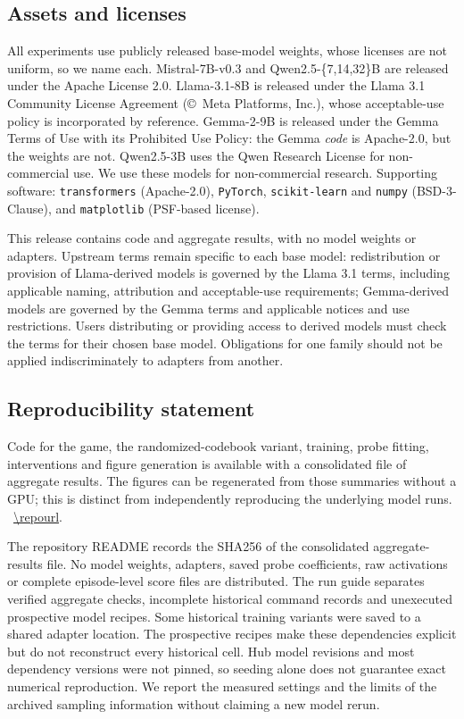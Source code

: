 \documentclass{article}
\begin{document}
\subsection{Assets and licenses}
\label{app:licenses}

All experiments use publicly released base-model weights, whose licenses are not uniform, so we
name each. Mistral-7B-v0.3 and Qwen2.5-\{7,14,32\}B are released under the
Apache License 2.0. Llama-3.1-8B is released under the Llama 3.1 Community License
Agreement (\copyright~Meta Platforms, Inc.), whose acceptable-use policy is incorporated by reference.
Gemma-2-9B is released under the Gemma Terms of Use with its Prohibited Use Policy: the Gemma \emph{code} is Apache-2.0, but the weights are not.
Qwen2.5-3B uses the Qwen Research License for non-commercial use. We use these models for non-commercial research. Supporting software: \texttt{transformers} (Apache-2.0), \texttt{PyTorch}, \texttt{scikit-learn} and \texttt{numpy} (BSD-3-Clause), and \texttt{matplotlib} (PSF-based license).

This release contains code and aggregate results, with no model weights or adapters. Upstream terms remain specific to each base model: redistribution or provision of Llama-derived models is governed by the Llama 3.1 terms, including applicable naming, attribution and acceptable-use requirements; Gemma-derived models are governed by the Gemma terms and applicable notices and use restrictions. Users distributing or providing access to derived models must check the terms for their chosen base model. Obligations for one family should not be applied indiscriminately to adapters from another.

\subsection{Reproducibility statement}
\label{app:repro}
\label{sec:repro}
Code for the game, the randomized-codebook variant, training, probe fitting, interventions and figure generation is available with a consolidated file of aggregate results. The figures can be regenerated from those summaries without a GPU; this is distinct from independently reproducing the underlying model runs. \repolead\ \expandafter\url\expandafter{\repourl}.

The repository README records the SHA256 of the consolidated aggregate-results file. No model weights, adapters, saved probe coefficients, raw activations or complete episode-level score files are distributed. The run guide separates verified aggregate checks, incomplete historical command records and unexecuted prospective model recipes. Some historical training variants were saved to a shared adapter location. The prospective recipes make these dependencies explicit but do not reconstruct every historical cell. Hub model revisions and most dependency versions were not pinned, so seeding alone does not guarantee exact numerical reproduction. We report the measured settings and the limits of the archived sampling information without claiming a new model rerun.
\end{document}
